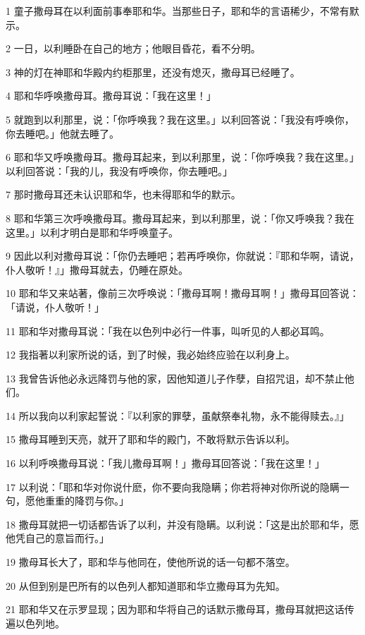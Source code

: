 \par 1 童子撒母耳在以利面前事奉耶和华。当那些日子，耶和华的言语稀少，不常有默示。
\par 2 一日，以利睡卧在自己的地方；他眼目昏花，看不分明。
\par 3 神的灯在神耶和华殿内约柜那里，还没有熄灭，撒母耳已经睡了。
\par 4 耶和华呼唤撒母耳。撒母耳说：「我在这里！」
\par 5 就跑到以利那里，说：「你呼唤我？我在这里。」以利回答说：「我没有呼唤你，你去睡吧。」他就去睡了。
\par 6 耶和华又呼唤撒母耳。撒母耳起来，到以利那里，说：「你呼唤我？我在这里。」以利回答说：「我的儿，我没有呼唤你，你去睡吧。」
\par 7 那时撒母耳还未认识耶和华，也未得耶和华的默示。
\par 8 耶和华第三次呼唤撒母耳。撒母耳起来，到以利那里，说：「你又呼唤我？我在这里。」以利才明白是耶和华呼唤童子。
\par 9 因此以利对撒母耳说：「你仍去睡吧；若再呼唤你，你就说：『耶和华啊，请说，仆人敬听！』」撒母耳就去，仍睡在原处。
\par 10 耶和华又来站著，像前三次呼唤说：「撒母耳啊！撒母耳啊！」撒母耳回答说：「请说，仆人敬听！」
\par 11 耶和华对撒母耳说：「我在以色列中必行一件事，叫听见的人都必耳鸣。
\par 12 我指著以利家所说的话，到了时候，我必始终应验在以利身上。
\par 13 我曾告诉他必永远降罚与他的家，因他知道儿子作孽，自招咒诅，却不禁止他们。
\par 14 所以我向以利家起誓说：『以利家的罪孽，虽献祭奉礼物，永不能得赎去。』」
\par 15 撒母耳睡到天亮，就开了耶和华的殿门，不敢将默示告诉以利。
\par 16 以利呼唤撒母耳说：「我儿撒母耳啊！」撒母耳回答说：「我在这里！」
\par 17 以利说：「耶和华对你说什麽，你不要向我隐瞒；你若将神对你所说的隐瞒一句，愿他重重的降罚与你。」
\par 18 撒母耳就把一切话都告诉了以利，并没有隐瞒。以利说：「这是出於耶和华，愿他凭自己的意旨而行。」
\par 19 撒母耳长大了，耶和华与他同在，使他所说的话一句都不落空。
\par 20 从但到别是巴所有的以色列人都知道耶和华立撒母耳为先知。
\par 21 耶和华又在示罗显现；因为耶和华将自己的话默示撒母耳，撒母耳就把这话传遍以色列地。

